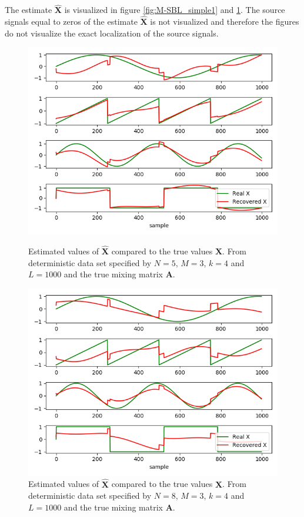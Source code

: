 The estimate $\hat{\mathbf{X}}$ is visualized in figure \ref{fig:M-SBL_simple1} and \ref{fig:M-SBL_simple2}. 
The source signals equal to zeros of the estimate $\hat{\mathbf{X}}$ is not visualized and therefore the figures do not visualize the exact localization of the source signals.
\begin{figure}[H]
    \begin{minipage}[t]{.45\textwidth}
    	\centering
		\includegraphics[scale=0.45]{figures/ch_6/M-SBL_simple1.png}
		\caption{Estimated values of $\hat{\mathbf{X}}$ compared to the true 					values $\mathbf{X}$. From deterministic data set specified by $N = 5$, $M = 3$, $k = 4$ and $L = 1000$ and the true mixing matrix $\mathbf{A}$.}
		\label{fig:M-SBL_simple1}
    \end{minipage} 
    \hfill
    \begin{minipage}[t]{.45\textwidth}
        \centering
		\includegraphics[scale=0.45]{figures/ch_6/M-SBL_simple2.png}
		\caption{Estimated values of $\hat{\mathbf{X}}$ compared to the true values $\mathbf{X}$. From deterministic data set specified by $N = 8$, $M = 3$, $k = 4$ and $L = 1000$ and the true mixing matrix $\mathbf{A}$.}
		\label{fig:M-SBL_simple2}
    \end{minipage}
\end{figure}
